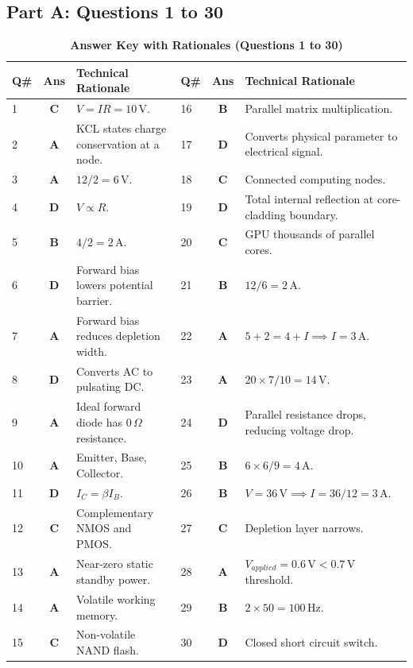 \subsection*{Part A: Questions 1 to 30}
\begin{table}[htbp]
\centering
\caption{\textbf{Answer Key with Rationales (Questions 1 to 30)}}
\vspace{2mm}
\small
\begin{tabularx}{\textwidth}{l c X l c X}
\toprule
\textbf{Q\#} & \textbf{Ans} & \textbf{Technical Rationale} & \textbf{Q\#} & \textbf{Ans} & \textbf{Technical Rationale} \\
\midrule
1 & \textbf{C} & $V = IR = 10\,\text{V}$. & 16 & \textbf{B} & Parallel matrix multiplication. \\
2 & \textbf{A} & KCL states charge conservation at a node. & 17 & \textbf{D} & Converts physical parameter to electrical signal. \\
3 & \textbf{A} & $12/2 = 6\,\text{V}$. & 18 & \textbf{C} & Connected computing nodes. \\
4 & \textbf{D} & $V \propto R$. & 19 & \textbf{D} & Total internal reflection at core-cladding boundary. \\
5 & \textbf{B} & $4/2 = 2\,\text{A}$. & 20 & \textbf{C} & GPU thousands of parallel cores. \\
6 & \textbf{D} & Forward bias lowers potential barrier. & 21 & \textbf{B} & $12 / 6 = 2\,\text{A}$. \\
7 & \textbf{A} & Forward bias reduces depletion width. & 22 & \textbf{A} & $5+2 = 4+I \implies I = 3\,\text{A}$. \\
8 & \textbf{D} & Converts AC to pulsating DC. & 23 & \textbf{A} & $20 \times 7/10 = 14\,\text{V}$. \\
9 & \textbf{A} & Ideal forward diode has $0\,\Omega$ resistance. & 24 & \textbf{D} & Parallel resistance drops, reducing voltage drop. \\
10 & \textbf{A} & Emitter, Base, Collector. & 25 & \textbf{B} & $6 \times 6/9 = 4\,\text{A}$. \\
11 & \textbf{D} & $I_C = \beta I_B$. & 26 & \textbf{B} & $V = 36\,\text{V} \implies I = 36/12 = 3\,\text{A}$. \\
12 & \textbf{C} & Complementary NMOS and PMOS. & 27 & \textbf{C} & Depletion layer narrows. \\
13 & \textbf{A} & Near-zero static standby power. & 28 & \textbf{A} & $V_{applied} = 0.6\,\text{V} < 0.7\,\text{V}$ threshold. \\
14 & \textbf{A} & Volatile working memory. & 29 & \textbf{B} & $2 \times 50 = 100\,\text{Hz}$. \\
15 & \textbf{C} & Non-volatile NAND flash. & 30 & \textbf{D} & Closed short circuit switch. \\
\bottomrule
\end{tabularx}
\end{table}

